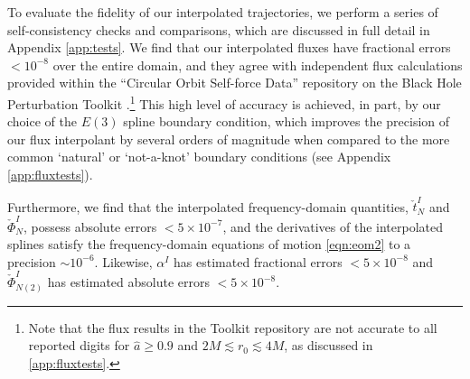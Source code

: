 \documentclass[%
 reprint,
 nofootinbib,
 amsmath,amssymb,
 aps,
 prd,
]{revtex4-2}
\begin{document}
To evaluate the fidelity of our interpolated trajectories, we perform a series of self-consistency checks and comparisons, which are discussed in full detail in Appendix \ref{app:tests}. We find that our interpolated fluxes have fractional errors $< 10^{-8}$ over the entire domain, and they agree with independent flux calculations \cite{TaraETC14, GralHughWarb16} provided within the ``Circular Orbit Self-force Data'' repository on the Black Hole Perturbation Toolkit \cite{BHPTK18}.\footnote{Note that the flux results in the Toolkit repository are not accurate to all reported digits for $\hat{a} \geq 0.9$ and $ 2M \lesssim r_0 \lesssim 4 M$, as discussed in \ref{app:fluxtests}.} This high level of accuracy is achieved, in part, by our choice of the $E(3)$ spline boundary condition, which improves the precision of our flux interpolant by several orders of magnitude when compared to the more common `natural' or `not-a-knot' boundary conditions (see Appendix \ref{app:fluxtests}). 

Furthermore, we find that the interpolated frequency-domain quantities, $\check{t}^I_N$ and $\check{\Phi}^I_N$, possess absolute errors $< 5\times 10^{-7}$, and the derivatives of the interpolated splines satisfy the frequency-domain equations of motion \eqref{eqn:eom2} to a precision $\sim 10^{-6}$. Likewise, $\alpha^I$ has estimated fractional errors $< 5\times 10^{-8}$ and $\check{\Phi}^I_{N(2)}$ has estimated absolute errors $< 5\times 10^{-8}$.
\end{document}

